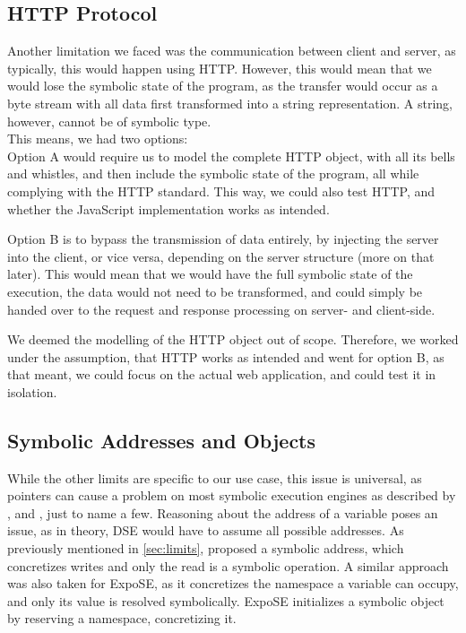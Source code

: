 \subsection{HTTP Protocol}
\label{sec:httpprot}
Another limitation we faced was the communication between client and server, as typically, this would happen using HTTP. However, this would mean that we would lose the symbolic state of the program, as the transfer would occur as a byte stream with all data first transformed into a string representation. 
A string, however, cannot be of symbolic type. \\
This means, we had two options:\\
Option A would require us to model the complete HTTP object, with all its bells and whistles, and then include the symbolic state of the program, all while complying with the HTTP standard. This way, we could also test HTTP, and whether the JavaScript implementation works as intended.

Option B is to bypass the transmission of data entirely, by injecting the server into the client, or vice versa, depending on the server structure (more on that later). This would mean that we would have the full symbolic state of the execution, the data would not need to be transformed, and could simply be handed over to the request and response processing on server- and client-side.


We deemed the modelling of the HTTP object out of scope. Therefore, we worked under the assumption, that HTTP works as intended and went for option B, as that meant, we could focus on the actual web application, and could test it in isolation.


\subsection{Symbolic Addresses and Objects}
\label{sec:sym-obj}
While the other limits are specific to our use case, this issue is universal, as pointers can cause a problem on most symbolic execution engines as described by \citet{cha_unleashing_2012}, \citet{coppa_rethinking_2017} and \citet{elkarablieh_precise_2009}, just to name a few. 
Reasoning about the address of a variable poses an issue, as in theory, DSE would have to assume all possible addresses. 
As previously mentioned in \autoref{sec:limits}, \citet{cha_unleashing_2012} proposed a symbolic address, which concretizes writes and only the read is a symbolic operation. 
A similar approach was also taken for ExpoSE, as it concretizes the namespace a variable can occupy, and only its value is resolved symbolically.
ExpoSE initializes a symbolic object by reserving a namespace, concretizing it.


